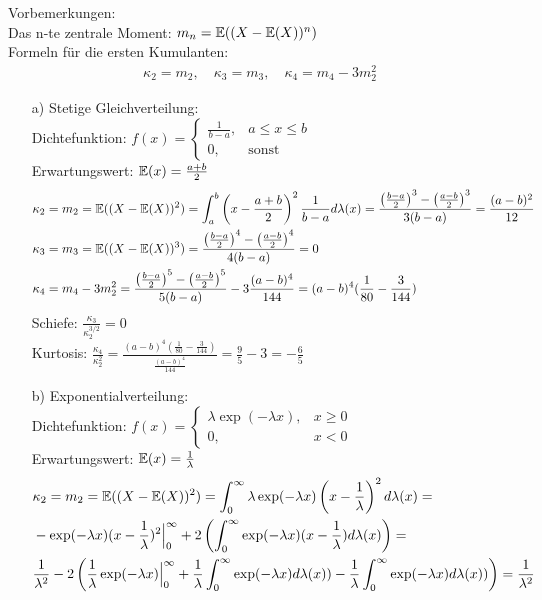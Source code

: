 \begin{solution}
Vorbemerkungen: \\
Das n-te zentrale Moment: $m_n = \mathbb{E}((X-\mathbb{E}(X))^n)$ \\
Formeln für die ersten Kumulanten: \\
\begin{align*}
  \kappa_2 = m_2,\quad \kappa_3 = m_3,\quad \kappa_4 = m_4 - 3m_2^2
\end{align*}
\begin{itemize}

  \item[a)] Stetige Gleichverteilung: \\
  Dichtefunktion: $f(x) = \begin{cases} \frac{1}{b-a}, & a \leq x \leq b \\ 0, & \text{sonst} \end{cases}$ \\
  Erwartungswert: $\mathbb{E}(x) = \frac{a+b}{2}$
  \begin{align*}
    &\kappa_2 = m_2 = \mathbb{E}((X-\mathbb{E}(X))^{2}) = \int_a^b\left(x-\frac{a+b}{2}\right)^2\frac{1}{b-a}d\lambda(x) = \frac{\left(\frac{b-a}{2}\right)^{3} - \left(\frac{a-b}{2}\right)^{3}}{3(b-a)} = \frac{(a-b)^2}{12} \\
    &\kappa_3 = m_3 = \mathbb{E}((X-\mathbb{E}(X))^{3}) = \frac{\left(\frac{b-a}{2}\right)^{4} - \left(\frac{a-b}{2}\right)^{4}}{4(b-a)} = 0\\
    &\kappa_4 = m_4 - 3m_2^2 = \frac{\left(\frac{b-a}{2}\right)^{5} - \left(\frac{a-b}{2}\right)^{5}}{5(b-a)} - 3\frac{(a-b)^4}{144} = (a-b)^4(\frac{1}{80}-\frac{3}{144})
  \end{align*}
  Schiefe: $\frac{\kappa_3}{\kappa_2^{3/2}} = 0$ \\
  Kurtosis: $\frac{\kappa_4}{\kappa_2^2} = \frac{(a-b)^4(\frac{1}{80}-\frac{3}{144})}{\frac{(a-b)^4}{144}} = \frac{9}{5} - 3 = -\frac{6}{5}$
  \item[b)]Exponentialverteilung: \\
  Dichtefunktion: $f(x) = \begin{cases} \lambda\exp(-\lambda x), & x \geq 0 \\ 0, & x < 0 \end{cases}$ \\
  Erwartungswert: $\mathbb{E}(x) = \frac{1}{\lambda}$
  \begin{align*}
    &\kappa_2 = m_2 = \kum{2} = \int_0^{\infty}\lambda\exp(-\lambda x)\left(x-\frac{1}{\lambda}\right)^2d\lambda(x) = \\
    &-\exp(-\lambda x)(x-\frac{1}{\lambda})^2\Big|_0^{\infty} +2\left(\int_0^{\infty}\exp(-\lambda x)(x-\frac{1}{\lambda})d\lambda(x)\right) = \\
    &\frac{1}{\lambda^2} - 2\left(\frac{1}{\lambda}\exp(-\lambda x)\Big|_0^{\infty} + \frac{1}{\lambda}\int_0^{\infty}\exp(-\lambda x)d\lambda(x)) - \frac{1}{\lambda}\int_0^{\infty}\exp(-\lambda x)d\lambda(x))\right) = \frac{1}{\lambda^2} \\

\end{align*}
\end{itemize}
\end{solution}
